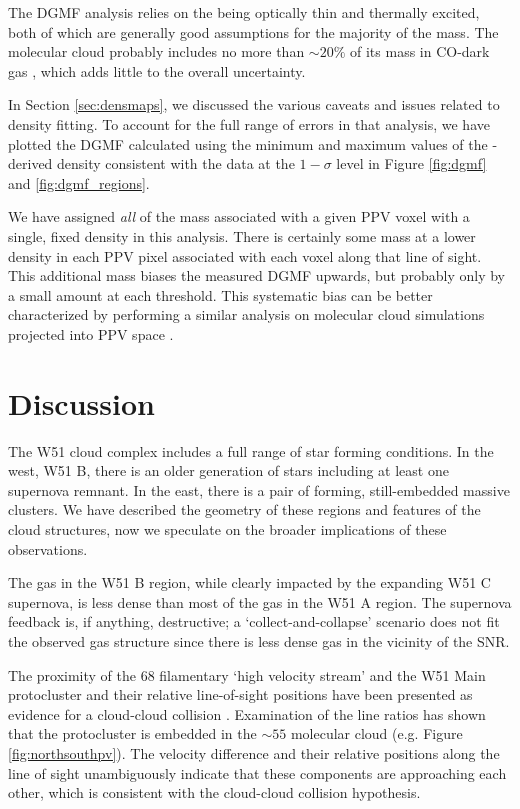 The DGMF analysis relies on the \thirteenco being optically thin and thermally
excited, both of which are generally good assumptions for the majority of the
mass.  The molecular cloud probably includes no more than $\sim20\%$ of its mass
in CO-dark gas \citep{Pineda2013a,Langer2013a,Smith2014b}, which adds little to
the overall uncertainty.

In Section \ref{sec:densmaps}, we discussed the various caveats and issues
related to \formaldehyde density fitting.  To account for the full range of
errors in that analysis, we have plotted the DGMF calculated using the minimum
and maximum values of the \formaldehyde-derived density consistent with the
data at the $1-\sigma$ level in Figure \ref{fig:dgmf} and
\ref{fig:dgmf_regions}.

We have assigned \emph{all} of the mass associated with a given PPV voxel with
a single, fixed density in this analysis.  There is certainly some mass at a
lower density in each PPV pixel associated with each voxel along that line of
sight.  This additional mass biases the measured DGMF upwards,
but probably only by a small amount at each
threshold.  This systematic bias can be better characterized by performing a
similar analysis on molecular cloud simulations projected into PPV space
\citep[as demonstrated for other analysis techniques by][]{Beaumont2013a}.


\section{Discussion}
\label{sec:discussion}
The W51 cloud complex includes a full range of star forming conditions.  In the
west, W51 B, there is an older generation of stars including at least one supernova
remnant.  In the east, there is a pair of forming, still-embedded massive clusters.
We have described the geometry of these regions and features of the cloud structures,
now we speculate on the broader implications of these observations.

The gas in the W51 B region, while clearly impacted by the expanding W51 C
supernova, is less dense than most of the gas in the W51 A region.  The
supernova feedback is, if anything, destructive; a `collect-and-collapse'
scenario does not fit the observed gas structure since there is less dense
gas in the vicinity of the SNR.

The proximity of the 68 \kms filamentary `high velocity stream' and the W51
Main protocluster and their relative line-of-sight positions have been
presented as evidence for a cloud-cloud collision \citep{Kang2010a}.
Examination of the \formaldehyde line ratios has shown that the protocluster is
embedded in the $\sim55$ \kms molecular cloud (e.g. Figure
\ref{fig:northsouthpv}).  The velocity difference and their relative positions
along the line of sight unambiguously indicate that these
components are approaching each other, which is consistent with the cloud-cloud
collision hypothesis.

